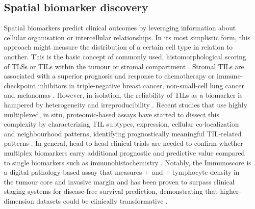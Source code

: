 \subsection*{Spatial biomarker discovery}

Spatial biomarkers predict clinical outcomes by leveraging information about cellular organisation or intercellular relationships. In its most simplistic form, this approach might measure the distribution of a certain cell type in relation to another. This is the basic concept of commonly used, histomorphological scoring of \acp{TLS} or \acp{TIL} within the tumour or stromal compartment . Stromal \acp{TIL} are associated with a superior prognosis and response to chemotherapy or immune-checkpoint inhibitors in triple-negative breast cancer, non-small-cell lung cancer and melanomas \parencite{Azimi2012-aa,Lee2016-hg,Helmink2020-gz,Chen2020-ua,Salgado2015-ne}. However, in isolation, the reliability of \acp{TIL} as a biomarker is hampered by heterogeneity and irreproducibility \parencite{Salgado2015-ne}. Recent studies that use highly multiplexed, in situ, proteomic-based assays have started to dissect this complexity by characterizing \ac{TIL} subtypes, expression, cellular co-localization and neighbourhood patterns, identifying prognostically meaningful \ac{TIL}-related patterns \parencite{Moldoveanu2022-qu,Keren2018-or}. In general, head-to-head clinical trials are needed to confirm whether multiplex biomarkers carry additional prognostic and predictive value compared to single biomarkers such as  immunohistochemistry \parencite{Lu2019-lo}. Notably, the Immunoscore \parencite{Galon2006-ow} is a digital pathology-based assay that measures + and + lymphocyte density in the tumour core and invasive margin and has been proven to surpass clinical staging systems for disease-free survival prediction, demonstrating that higher-dimension datasets could be clinically transformative \parencite{Pages2018-ka}.


